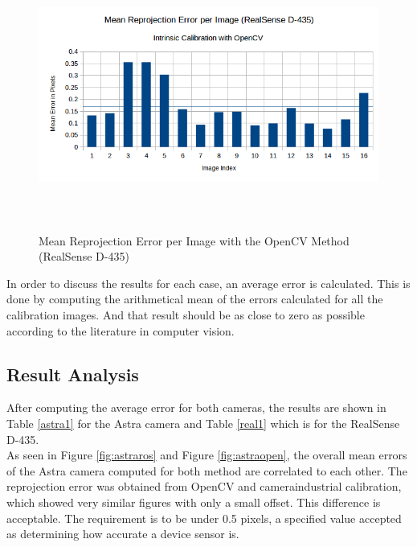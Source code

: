 \begin{figure}[!h]
\begin{center}
\includegraphics[width=5in, height=3.5in]{figures05/int/opencv_int_cal_real.png}
\caption{Mean Reprojection Error per Image with the OpenCV Method (RealSense D-435)}%
\label{fig:realopen}
\end{center}
\end{figure}

In order to discuss the results for each case, an average error is calculated. This is done by computing the arithmetical mean of the errors calculated for all the calibration images. And that result should be as close to zero as possible according to the literature in computer vision.

\subsection{Result Analysis}
After computing the average error for both cameras, the results are shown in Table \ref{astra1} for the Astra camera and Table \ref{real1} which is for the RealSense D-435.\\
 As seen in Figure \ref{fig:astraros} and Figure \ref{fig:astraopen}, the overall mean errors of the Astra camera computed for both method are correlated to each other. The reprojection error was obtained from OpenCV and camera\textunderscore industrial calibration, which showed very similar figures with only a small offset. This difference is acceptable. The requirement is to be under 0.5 pixels, a specified value accepted as determining how accurate a device sensor is. \\
 
